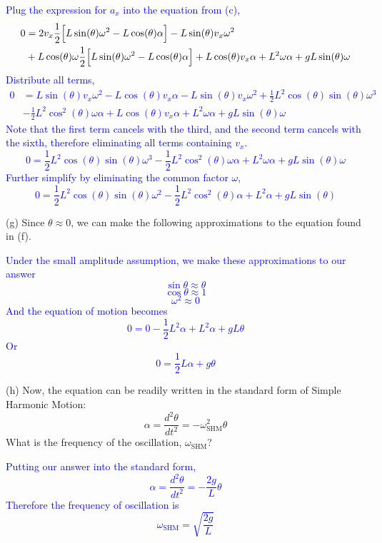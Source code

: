 \documentclass[11pt]{article}
\theoremstyle{gangnamstyle}{\newtheorem{definition}{Definition}[]}
\theoremstyle{gangnamstyle}{\newtheorem{example}{Example}[]}
\theoremstyle{gangnamstyle}{\newtheorem{problem}{Problem}[]}
\begin{document}
\textcolor{blue}{Plug the expression for $a_x$ into the equation from (c),
\[ \begin{aligned} 0 &= 2v_x\frac{1}{2}\Bigl[ L\sin(\theta)\omega^2 - L\cos(\theta)\alpha \Bigr] - L\sin(\theta)v_x\omega^2 \\
&+ L\cos(\theta)\omega\frac{1}{2}\Bigl[ L\sin(\theta)\omega^2 - L\cos(\theta)\alpha \Bigr] + L\cos(\theta)v_x\alpha + L^2\omega\alpha + gL\sin(\theta)\omega
\end{aligned} \]
Distribute all terms,
\[ \begin{aligned} 0 &= L\sin(\theta)v_x\omega^2 - L\cos(\theta)v_x\alpha - L\sin(\theta)v_x\omega^2 + \frac{1}{2}L^2\cos(\theta)\sin(\theta)\omega^3 \\ 
&- \frac{1}{2}L^2\cos^2(\theta)\omega \alpha + L\cos(\theta)v_x\alpha + L^2\omega\alpha + gL\sin(\theta)\omega
\end{aligned} \]
Note that the first term cancels with the third, and the second term cancels with the sixth, therefore eliminating all terms containing $v_x$. 
\[ 0 = \frac{1}{2}L^2\cos(\theta)\sin(\theta)\omega^3 - \frac{1}{2}L^2\cos^2(\theta)\omega \alpha + L^2\omega\alpha + gL\sin(\theta)\omega \]
Further simplify by eliminating the common factor $\omega$, 
\begin{equation}
0 = \frac{1}{2}L^2\cos(\theta)\sin(\theta)\omega^2 - \frac{1}{2}L^2\cos^2(\theta)\alpha + L^2\alpha + gL\sin(\theta)
\end{equation}
}

(g) Since $\theta \approx 0$, we can make the following approximations to the equation found in (f). 

\textcolor{blue}{
Under the small amplitude assumption, we make these approximations to our answer
\[ \sin\theta \approx \theta \]
\[ \cos\theta \approx 1 \]
\[ \omega^2 \approx 0 \]
And the equation of motion becomes
\[ 0 = 0 - \frac{1}{2}L^2\alpha + L^2\alpha + gL\theta \]
Or
\begin{equation}
0 = \frac{1}{2}L\alpha + g\theta
\end{equation}}

\pagebreak

(h) Now, the equation can be readily written in the standard form of Simple Harmonic Motion: 
\[ \alpha = \frac{d^2\theta}{dt^2} = -\omega_{\text{SHM}}^2\theta \]
What is the frequency of the oscillation, $\omega_{\text{SHM}}$? 

\textcolor{blue}{Putting our answer into the standard form, 
\[ \alpha = \frac{d^2\theta}{dt^2} = - \frac{2g}{L}\theta \]
Therefore the frequency of oscillation is
\[ \omega_{\text{SHM}} = \sqrt{\frac{2g}{L}} \]}
\end{document}
